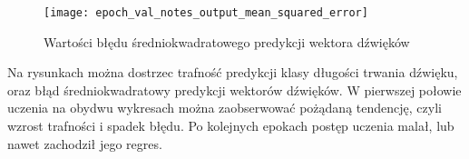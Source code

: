{{        \begin{figure}[H]
            \centering
            \texttt{[image: epoch\_val\_notes\_output\_mean\_squared\_error]}
            \caption{Wartości błędu średniokwadratowego predykcji wektora dźwięków}
            \label{epoch_val_notes_output_mean_squared_error}
        \end{figure}

        Na rysunkach można dostrzec trafność predykcji klasy długości trwania dźwięku, oraz błąd średniokwadratowy
        predykcji wektorów dźwięków. W\,\,pierwszej połowie uczenia na obydwu wykresach można zaobserwować pożądaną tendencję,
        czyli wzrost trafności i\,\,spadek błędu. Po kolejnych epokach postęp uczenia malał, lub nawet zachodził jego regres.
    }
}